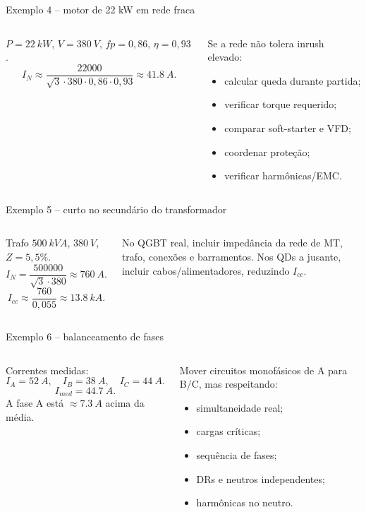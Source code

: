 \begin{frame}{Exemplo 4 -- motor de 22 kW em rede fraca}
\small
\begin{columns}[T,onlytextwidth]
\begin{caixaEx}
$P=\SI{22}{kW}$, $V=\SI{380}{V}$, $fp=0{,}86$, $\eta=0{,}93$.
\[
I_N\approx\frac{22000}{\sqrt3\cdot380\cdot0{,}86\cdot0{,}93}
\approx\SI{41.8}{A}.
\]
\end{caixaEx}
\begin{caixaProjeto}[title=Decisão]
Se a rede não tolera inrush elevado:
\begin{itemize}
\item calcular queda durante partida;
\item verificar torque requerido;
\item comparar soft-starter e VFD;
\item coordenar proteção;
\item verificar harmônicas/EMC.
\end{itemize}
\end{caixaProjeto}
\end{columns}
\end{frame}
\begin{frame}{Exemplo 5 -- curto no secundário do transformador}
\small
\begin{columns}[T,onlytextwidth]
\begin{caixaEx}
Trafo $\SI{500}{kVA}$, $\SI{380}{V}$, $Z=5{,}5\%$.
\[
I_N=\frac{500000}{\sqrt3\cdot380}\approx\SI{760}{A}.
\]
\[
I_{cc}\approx\frac{760}{0{,}055}\approx\SI{13.8}{kA}.
\]
\end{caixaEx}
\begin{caixaObs}
No QGBT real, incluir impedância da rede de MT, trafo, conexões e barramentos. Nos QDs a jusante, incluir cabos/alimentadores, reduzindo $I_{cc}$.
\end{caixaObs}
\end{columns}
\end{frame}
\begin{frame}{Exemplo 6 -- balanceamento de fases}
\small
\begin{columns}[T,onlytextwidth]
\begin{caixaEx}
Correntes medidas:
\[
I_A=\SI{52}{A},\quad I_B=\SI{38}{A},\quad I_C=\SI{44}{A}.
\]
\[
I_{med}=\SI{44.7}{A}.
\]
A fase A está $\approx\SI{7.3}{A}$ acima da média.
\end{caixaEx}
\begin{caixaProjeto}[title=Ação]
Mover circuitos monofásicos de A para B/C, mas respeitando:
\begin{itemize}
\item simultaneidade real;
\item cargas críticas;
\item sequência de fases;
\item DRs e neutros independentes;
\item harmônicas no neutro.
\end{itemize}
\end{caixaProjeto}
\end{columns}
\end{frame}

